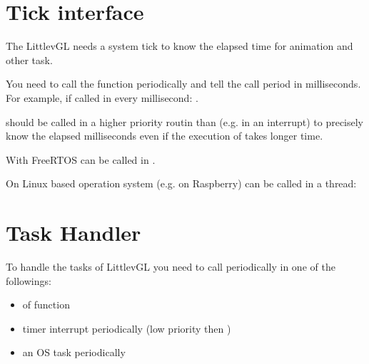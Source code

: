 \documentclass[letterpaper,10pt,english]{sphinxmanual}
\begin{document}
\section{Tick interface}
\label{\detokenize{porting/tick:tick-interface}}\label{\detokenize{porting/tick::doc}}
The LittlevGL needs a system tick to know the elapsed time for animation and other task.

You need to call the  function periodically and tell the call period in milliseconds. For example, if called in every millisecond: .

 should be called in a higher priority routin than (e.g. in an interrupt) to precisely know the elapsed milliseconds even if the execution of  takes longer time.

With FreeRTOS  can be called in .

On Linux based operation system (e.g. on Raspberry)  can be called in a thread:

\begin{sphinxVerbatim}[commandchars=\\\{\}]
    
       
           
              
\end{sphinxVerbatim}


\section{Task Handler}
\label{\detokenize{porting/task-handler:task-handler}}\label{\detokenize{porting/task-handler::doc}}
To handle the tasks of LittlevGL you need to call  periodically in one of the followings:
\begin{itemize}
\item {} 
 of  function

\item {} 
timer interrupt periodically (low priority then )

\item {} 
an OS task periodically

\end{itemize}
\end{document}
